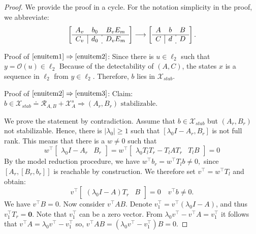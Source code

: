 \begin{proof}
We provide the proof in a cycle. For the notation simplicity in the proof, we abbreviate:
\[
\left[\begin{array}{c|c:c}
    A_v & b_0 & B_v E_m\\
    \hline
    C_v & d_0 & D_v E_m
\end{array}\right] \longrightarrow 
\left[\begin{array}{c|c:c}
    A & b & B\\
    \hline
    C & d & D
\end{array}\right].
\]

Proof of \(\ref{enuitem1} \Rightarrow\ref{enuitem2}\):
Since there is \(u\in\ell_2\) such that \(y = \mathcal{O}(u)\in \ell_2\)
Because of the detectability of \((A,C)\), the states \(x\) is a sequence in \(\ell_2\) from \(y\in\ell_2\). 
Therefore, \(b\) lies in \(\mathcal{X}_{stab}\).

Proof of \(\ref{enuitem2}\Rightarrow \ref{enuitem3}\):
Claim: $b\in \mathcal{X}_{stab} \doteq \mathcal{R}_{A,B} + \mathcal{X}_A^s \Longrightarrow (A_r,B_r) {\text{ stabilizable}}$.

We prove the statement by contradiction. 
Assume that $ b\in \mathcal{X}_{stab}$ but  $(A_r,B_r)$ not stabilizable. 
Hence, there is \(|\lambda_0| \geq 1\) such that \([\lambda_0 I- A_r,B_r]\) is not full rank. This means that there is a $w\neq 0$ such that
\begin{equation}\label{notstab.eq}
w^\top \begin{bmatrix}\lambda_0 I -A_r&B_r\end{bmatrix}= w^\top \begin{bmatrix}\lambda_0 T_l T_r -T_l A T_r & T_l B\end{bmatrix} = 0
\end{equation}
By the model reduction procedure, we have 
\(w^\top b_r = w^\top T_l b \neq 0,\)
since $[A_r,[B_r,b_r]]$ is reachable by construction. We therefore set \(v^\top = w^\top T_l\) and obtain:
\[
v^\top\begin{bmatrix}
(\lambda_0 I - A)T_r & B 
\end{bmatrix}=0 \quad v^\top b \neq 0.
\]
We have $v^\top B=0$. Now consider $v^\top AB$. 
Denote \(v_1^\top = v^\top (\lambda_0 I - A)\), and thus \(v_1^\top T_r = \mathbf{0}\). 
Note that \(v_1^\top\) can be a zero vector.
From $\lambda_0 v^\top-v^\top A=v_1^\top $ it follows that $v^\top A=\lambda_0 v^\top-v_1^\top$ so, $v^\top AB=(\lambda_0 v^\top-v_1^\top)B=0$.


\end{proof}
